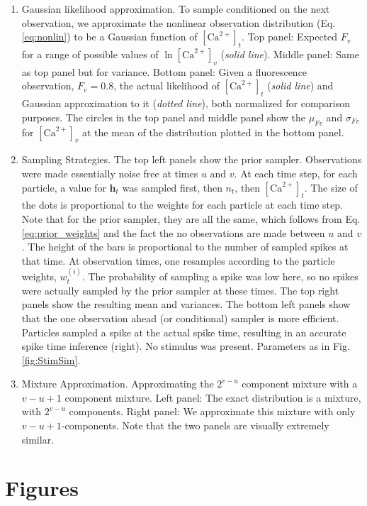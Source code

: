 \documentclass[12pt]{article}
\providecommand{\ve}[1]{\boldsymbol{#1}}
\providecommand{\ve}[1]{\boldsymbol{#1}}
\newcommand{\Ca}{[\text{Ca}^{2+}]}
\begin{document}
\begin{enumerate}
\item Gaussian likelihood approximation.  To sample conditioned on the next observation, we approximate the nonlinear observation distribution (Eq. \ref{eq:nonlin}) to be a Gaussian function of $\Ca_t$.  Top panel: Expected $F_v$ for a range of possible values of $\ln \Ca_v$ (\emph{solid line}).  Middle panel: Same as top panel but for variance. Bottom panel: Given a fluorescence observation, $F_v=0.8$, the actual likelihood of $\Ca_t$ (\emph{solid line}) and Gaussian approximation to it (\emph{dotted line}), both normalized for comparison purposes. The circles in the top panel and middle panel show the $\mu_{Fv}$ and $\sigma_{Fv}$ for $\Ca_v$ at the mean of the distribution plotted in the bottom panel.
\item Sampling Strategies.  The top left panels show the prior sampler.  Observations were made essentially noise free at times $u$ and $v$. At each time step, for each particle, a value for $\ve{h}_t$ was sampled first, then $n_t$, then $\Ca_t$.  The size of the dots is proportional to the weights for each particle at each time step.  Note that for the prior sampler, they are all the same, which follows from Eq. \ref{eq:prior_weights} and the fact the no observations are made between $u$ and $v$.  The height of the bars is proportional to the number of sampled spikes at that time. At observation times, one resamples according to the particle weights, $w_t^{(i)}$. The probability of sampling a spike was low here, so no spikes were actually sampled by the prior sampler at these times.  The top right panels show the resulting mean and variances.  The bottom left panels show that the one observation ahead (or conditional) sampler is more efficient. Particles sampled a spike at the actual spike time, resulting in an accurate spike time inference (right).  No stimulus was present. Parameters as in Fig. \ref{fig:StimSim}.
\item Mixture Approximation.  Approximating the $2^{v-u}$ component mixture with a $v-u+1$ component mixture. Left panel:  The exact distribution is a mixture, with $2^{v-u}$ components. Right panel:  We approximate this mixture with only $v-u+1$-components. Note that the two panels are visually extremely similar. 
\end{enumerate}

\clearpage \newpage
\section*{Figures}
\end{document}
